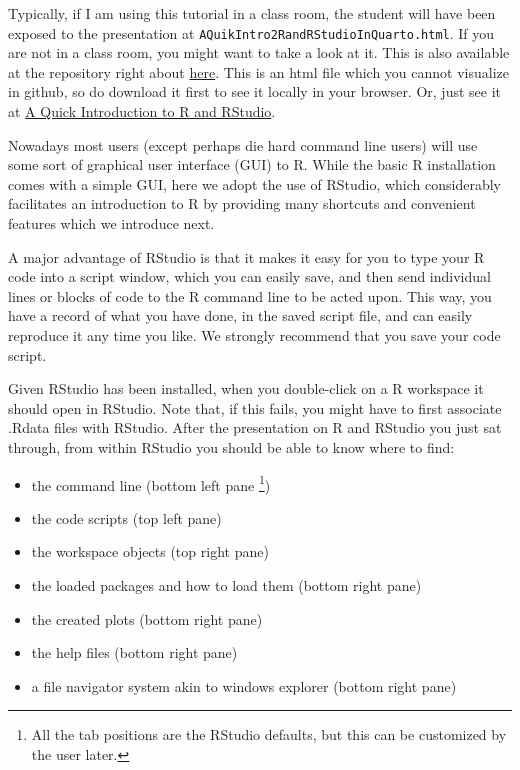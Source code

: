 \documentclass[
  letterpaper,
  DIV=11,
  numbers=noendperiod]{scrartcl}
\providecommand{\tightlist}{%
  \setlength{\itemsep}{0pt}\setlength{\parskip}{0pt}}
\begin{document}
Typically, if I am using this tutorial in a class room, the student will
have been exposed to the presentation at
\texttt{AQuikIntro2RandRStudioInQuarto.html}. If you are not in a class
room, you might want to take a look at it. This is also available at the
repository right about
\href{https://github.com/TiagoAMarques/AnIntro2RTutorial/blob/master/AQuikIntro2RandRStudioInQuarto.html}{here}.
This is an html file which you cannot visualize in github, so do
download it first to see it locally in your browser. Or, just see it at
\href{https://rpubs.com/talomarques/AnIntroToRandRStudio}{A Quick
Introduction to R and RStudio}.

Nowadays most users (except perhaps die hard command line users) will
use some sort of graphical user interface (GUI) to R. While the basic R
installation comes with a simple GUI, here we adopt the use of RStudio,
which considerably facilitates an introduction to R by providing many
shortcuts and convenient features which we introduce next.

A major advantage of RStudio is that it makes it easy for you to type
your R code into a script window, which you can easily save, and then
send individual lines or blocks of code to the R command line to be
acted upon. This way, you have a record of what you have done, in the
saved script file, and can easily reproduce it any time you like. We
strongly recommend that you save your code script.

Given RStudio has been installed, when you double-click on a R workspace
it should open in RStudio. Note that, if this fails, you might have to
first associate .Rdata files with RStudio. After the presentation on R
and RStudio you just sat through, from within RStudio you should be able
to know where to find:

\begin{itemize}
\tightlist
\item
  the command line (bottom left pane
  \footnote{All the tab positions are the RStudio defaults, but this can be customized by the user later.})
\item
  the code scripts (top left pane)
\item
  the workspace objects (top right pane)
\item
  the loaded packages and how to load them (bottom right pane)
\item
  the created plots (bottom right pane)
\item
  the help files (bottom right pane)
\item
  a file navigator system akin to windows explorer (bottom right pane)
\end{itemize}
\end{document}
